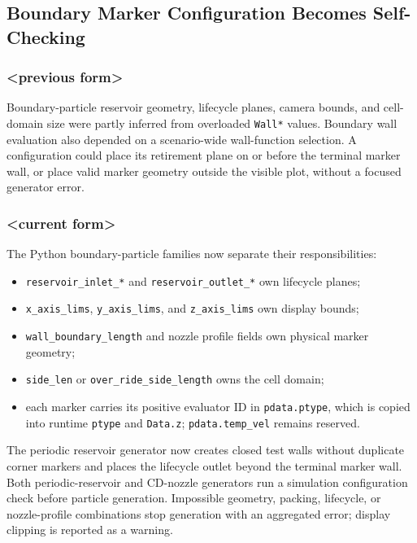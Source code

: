 \subsection{Boundary Marker Configuration Becomes Self-Checking}

\subsubsection{<previous form>}

Boundary-particle reservoir geometry, lifecycle planes, camera bounds, and
cell-domain size were partly inferred from overloaded \texttt{Wall*} values.
Boundary wall evaluation also depended on a scenario-wide wall-function
selection.  A configuration could place its retirement plane on or before the
terminal marker wall, or place valid marker geometry outside the visible plot,
without a focused generator error.

\subsubsection{<current form>}

The Python boundary-particle families now separate their responsibilities:

\begin{itemize}
    \item \texttt{reservoir\_inlet\_*} and
    \texttt{reservoir\_outlet\_*} own lifecycle planes;
    \item \texttt{x\_axis\_lims}, \texttt{y\_axis\_lims}, and
    \texttt{z\_axis\_lims} own display bounds;
    \item \texttt{wall\_boundary\_length} and nozzle profile fields own
    physical marker geometry;
    \item \texttt{side\_len} or \texttt{over\_ride\_side\_length} owns the
    cell domain;
    \item each marker carries its positive evaluator ID in
    \texttt{pdata.ptype}, which is copied into runtime \texttt{ptype} and
    \texttt{Data.z}; \texttt{pdata.temp\_vel} remains reserved.
\end{itemize}

The periodic reservoir generator now creates closed test walls without
duplicate corner markers and places the lifecycle outlet beyond the terminal
marker wall.  Both periodic-reservoir and CD-nozzle generators run a simulation
configuration check before particle generation.  Impossible geometry,
packing, lifecycle, or nozzle-profile combinations stop generation with an
aggregated error; display clipping is reported as a warning.

